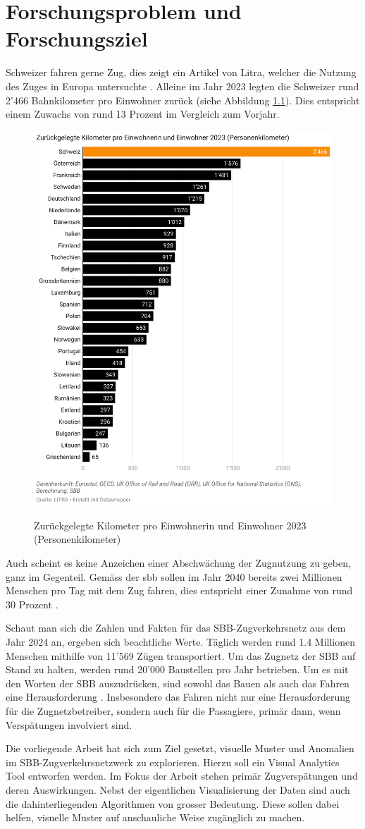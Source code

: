 \chapter{Forschungsproblem und Forschungsziel}
\label{kap:forschungsproblem_forschungsziel}
Schweizer fahren gerne Zug, dies zeigt ein Artikel von Litra, welcher die Nutzung des Zuges in Europa untersuchte \parencite{litra_bahnfahrtstatistik_europa_2023}. Alleine im Jahr 2023 legten die Schweizer rund 2'466 Bahnkilometer pro Einwohner zurück (siehe Abbildung \ref{fig_schweizer_fahren_zug}). Dies entspricht einem Zuwachs von rund 13 Prozent im Vergleich zum Vorjahr. 

\begin{figure}[H]
    \caption{Zurückgelegte Kilometer pro Einwohnerin und Einwohner 2023 (Personenkilometer) \parencite{litra_bahnfahrtstatistik_europa_2023}}
    \includegraphics[width=.4\linewidth]{content/00_assets/schweizer_fahren_zug.png}
    \label{fig_schweizer_fahren_zug}
\end{figure}

Auch scheint es keine Anzeichen einer Abschwächung der Zugnutzung zu geben, ganz im Gegenteil. Gemäss der \acrfull{sbb} sollen im Jahr 2040 bereits zwei Millionen Menschen pro Tag mit dem Zug fahren, dies entspricht einer Zunahme von rund 30 Prozent \parencite{sbb_ausbauschritt_2025}.

Schaut man sich die Zahlen und Fakten für das SBB-Zugverkehrsnetz aus dem Jahr 2024 an, ergeben sich beachtliche Werte. Täglich werden rund 1.4 Millionen Menschen mithilfe von 11'569 Zügen transportiert. Um das Zugnetz der SBB auf Stand zu halten, werden rund 20'000 Baustellen pro Jahr betrieben. Um es mit den Worten der SBB auszudrücken, sind sowohl das Bauen als auch das Fahren eine Herausforderung \parencite[S.8 - 9]{sbb_geschäftsbericht_2024}. Insbesondere das Fahren nicht nur eine Herausforderung für die Zugnetzbetreiber, sondern auch für die Passagiere, primär dann, wenn Verspätungen involviert sind.

Die vorliegende Arbeit hat sich zum Ziel gesetzt, visuelle Muster und Anomalien im SBB-Zugverkehrsnetzwerk zu explorieren. Hierzu soll ein Visual Analytics Tool entworfen werden. Im Fokus der Arbeit stehen primär Zugverspätungen und deren Auswirkungen. Nebst der eigentlichen Visualisierung der Daten sind auch die dahinterliegenden Algorithmen von grosser Bedeutung. Diese sollen dabei helfen, visuelle Muster auf anschauliche Weise zugänglich zu machen.

